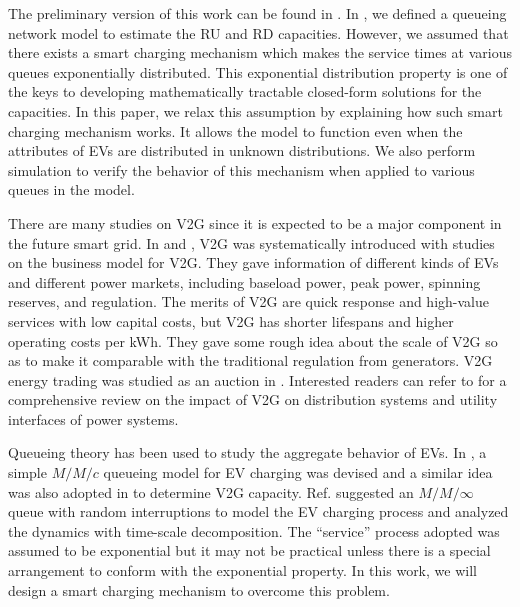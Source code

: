 \documentclass[journal]{IEEEtran}
\begin{document}
The preliminary version of this work can be found in \cite{smartgridcomm2012}.
In \cite{smartgridcomm2012}, we defined a queueing network model to estimate the RU and RD capacities. However, we assumed that there exists a smart charging mechanism which makes the service times at various queues exponentially distributed. This exponential distribution property is one of the keys to developing mathematically tractable closed-form solutions for the capacities. In this paper, we relax this assumption by explaining how such  smart charging mechanism works. It allows the model to function even when the attributes of EVs are distributed in unknown distributions. We also perform simulation to verify the behavior of this mechanism when applied to various queues in the model.

There are many studies on V2G since it is expected to be a major component in
the future smart grid.  In \cite{V2G_fundamentals} and
\cite{V2G_implementation}, V2G was systematically introduced with studies on the business model for V2G.  They gave information of
different kinds of EVs and different power markets, including baseload power,
peak power, spinning reserves, and regulation.  The merits of V2G are quick
response and high-value services with low capital costs, but V2G has shorter
lifespans and higher operating costs per kWh.  
They gave some rough idea about the scale of V2G so as to make it comparable
with the traditional regulation from generators.  
V2G energy trading was studied as an auction in \cite{doublelayer}. 
Interested readers can refer
to \cite{impact_review} for a comprehensive review on the impact of V2G on
distribution systems and utility interfaces of power systems.

Queueing theory has been used to study the aggregate behavior of EVs.
In \cite{EV_loadflow}, a simple $M/M/c$ queueing model for EV charging was
devised and a similar idea was also adopted in \cite{V2GParking} to determine V2G capacity. 
Ref. \cite{chargingmodel} suggested an $M/M/\infty$ queue with random interruptions to model the EV charging process and analyzed the dynamics with time-scale decomposition. 
The ``service'' process adopted was assumed to be exponential but it may not be practical unless there is a special arrangement to conform with the exponential property. In this work, we will design a smart charging mechanism to overcome this problem.
\end{document}
